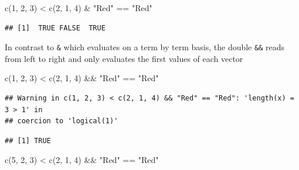 \documentclass[
]{book}
\newenvironment{Shaded}{\begin{snugshade}}{\end{snugshade}}
\newcommand{\DecValTok}[1]{\textcolor[rgb]{0.00,0.00,0.81}{#1}}
\newcommand{\FunctionTok}[1]{\textcolor[rgb]{0.00,0.00,0.00}{#1}}
\newcommand{\NormalTok}[1]{#1}
\newcommand{\SpecialCharTok}[1]{\textcolor[rgb]{0.00,0.00,0.00}{#1}}
\newcommand{\StringTok}[1]{\textcolor[rgb]{0.31,0.60,0.02}{#1}}
\theoremstyle{definition}
\theoremstyle{definition}
\theoremstyle{definition}
\theoremstyle{definition}
\theoremstyle{remark}
\begin{document}
\begin{Shaded}
\begin{Highlighting}[]
\FunctionTok{c}\NormalTok{(}\DecValTok{1}\NormalTok{, }\DecValTok{2}\NormalTok{, }\DecValTok{3}\NormalTok{) }\SpecialCharTok{\textless{}} \FunctionTok{c}\NormalTok{(}\DecValTok{2}\NormalTok{, }\DecValTok{1}\NormalTok{, }\DecValTok{4}\NormalTok{) }\SpecialCharTok{\&} \StringTok{"Red"} \SpecialCharTok{==} \StringTok{"Red"}
\end{Highlighting}
\end{Shaded}

\begin{verbatim}
## [1]  TRUE FALSE  TRUE
\end{verbatim}

In contrast to \texttt{\&} which evaluates on a term by term basis, the double \texttt{\&\&} reads from left to right and only evaluates the first values of each vector

\begin{Shaded}
\begin{Highlighting}[]
\FunctionTok{c}\NormalTok{(}\DecValTok{1}\NormalTok{, }\DecValTok{2}\NormalTok{, }\DecValTok{3}\NormalTok{) }\SpecialCharTok{\textless{}} \FunctionTok{c}\NormalTok{(}\DecValTok{2}\NormalTok{, }\DecValTok{1}\NormalTok{, }\DecValTok{4}\NormalTok{) }\SpecialCharTok{\&\&} \StringTok{"Red"} \SpecialCharTok{==} \StringTok{"Red"}
\end{Highlighting}
\end{Shaded}

\begin{verbatim}
## Warning in c(1, 2, 3) < c(2, 1, 4) && "Red" == "Red": 'length(x) = 3 > 1' in
## coercion to 'logical(1)'
\end{verbatim}

\begin{verbatim}
## [1] TRUE
\end{verbatim}

\begin{Shaded}
\begin{Highlighting}[]
\FunctionTok{c}\NormalTok{(}\DecValTok{5}\NormalTok{, }\DecValTok{2}\NormalTok{, }\DecValTok{3}\NormalTok{) }\SpecialCharTok{\textless{}} \FunctionTok{c}\NormalTok{(}\DecValTok{2}\NormalTok{, }\DecValTok{1}\NormalTok{, }\DecValTok{4}\NormalTok{) }\SpecialCharTok{\&\&} \StringTok{"Red"} \SpecialCharTok{==} \StringTok{"Red"}
\end{Highlighting}
\end{Shaded}
\end{document}
